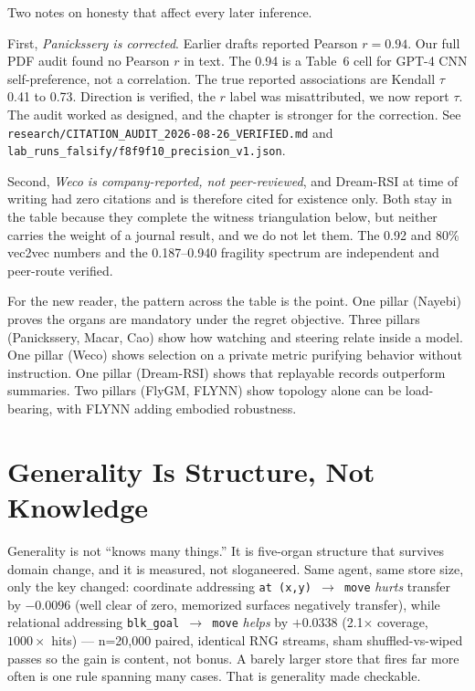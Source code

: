 Two notes on honesty that affect every later inference.

First, \textit{Panickssery is corrected}. Earlier drafts reported Pearson $r=0.94$. Our full PDF audit found no Pearson $r$ in text. The 0.94 is a Table~6 cell for GPT-4 CNN self-preference, not a correlation. The true reported associations are Kendall $\tau$ 0.41 to 0.73. Direction is verified, the $r$ label was misattributed, we now report $\tau$. The audit worked as designed, and the chapter is stronger for the correction. See \texttt{research/CITATION\_AUDIT\_2026-08-26\_VERIFIED.md} and \texttt{lab\_runs\_falsify/f8f9f10\_precision\_v1.json}.

Second, \textit{Weco is company-reported, not peer-reviewed}, and Dream-RSI at time of writing had zero citations and is therefore cited for existence only. Both stay in the table because they complete the witness triangulation below, but neither carries the weight of a journal result, and we do not let them. The 0.92 and 80\% vec2vec numbers and the 0.187--0.940 fragility spectrum are independent and peer-route verified.

For the new reader, the pattern across the table is the point. One pillar (Nayebi) proves the organs are mandatory under the regret objective. Three pillars (Panickssery, Macar, Cao) show how watching and steering relate inside a model. One pillar (Weco) shows selection on a private metric purifying behavior without instruction. One pillar (Dream-RSI) shows that replayable records outperform summaries. Two pillars (FlyGM, FLYNN) show topology alone can be load-bearing, with FLYNN adding embodied robustness.

\section{Generality Is Structure, Not Knowledge}
\label{sec:ch09-generality}

Generality is not ``knows many things.'' It is five-organ structure that survives domain change, and it is measured, not sloganeered. Same agent, same store size, only the key changed: coordinate addressing \texttt{at (x,y) $\to$ move} \textit{hurts} transfer by $-0.0096$ (well clear of zero, memorized surfaces negatively transfer), while relational addressing \texttt{blk\_goal $\to$ move} \textit{helps} by $+0.0338$ (2.1$\times$ coverage, $1000\times$ hits) --- n=20,000 paired, identical RNG streams, sham shuffled-vs-wiped passes so the gain is content, not bonus. A barely larger store that fires far more often is one rule spanning many cases. That is generality made checkable.

